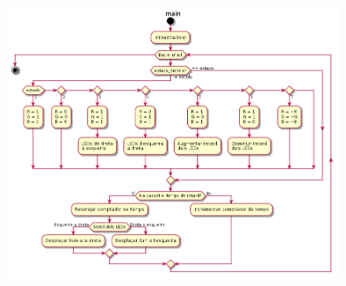 \documentclass[12pt,a4paper]{article}
\begin{document}
\begin{figure}[H]
  \centering
  \includegraphics[width=\textwidth]{main}
\end{figure}
\end{document}
